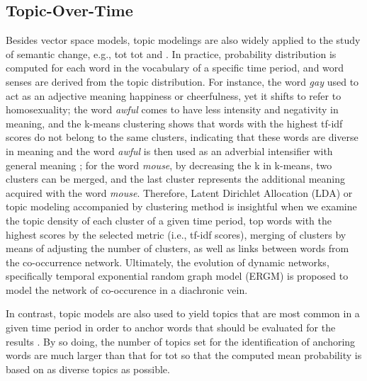 \subsection{Topic-Over-Time}
Besides vector space models, topic modelings are also widely applied to the study of semantic change, e.g., \acrlong{tot} \acrshort{tot} \parencite{wijaya2011understanding} and \textcite{hengchen2017phd}. In practice, probability distribution is computed for each word in the vocabulary of a specific time period, and word senses are derived from the topic distribution. For instance, the word \textit{gay} used to act as an adjective meaning happiness or cheerfulness, yet it shifts to refer to homosexuality; the word \textit{awful} comes to have less intensity and negativity in meaning, and the k-means clustering shows that words with the highest tf-idf scores do not belong to the same clusters, indicating that these words are diverse in meaning and the word \textit{awful} is then used as an adverbial intensifier with general meaning \parencite{wijaya2011understanding}; for the word \textit{mouse}, by decreasing the k in k-means, two clusters can be merged, and the last cluster represents the additional meaning acquired with the word \textit{mouse}. Therefore, Latent Dirichlet Allocation (LDA) or topic modeling accompanied by clustering method is insightful when we examine the topic density of each cluster of a given time period, top words with the highest scores by the selected metric (i.e., tf-idf scores), merging of clusters by means of adjusting the number of clusters, as well as links between words from the co-occurrence network. Ultimately, the evolution of dynamic networks, specifically temporal exponential random graph model (ERGM)\parencite{robins2007introduction} is proposed to model the network of co-occurence in a diachronic vein.

In contrast, topic models are also used to yield topics that are most common in a given time period in order to anchor words that should be evaluated for the results \parencite{antoniak2018evaluating}. By so doing, the number of topics set for the identification of anchoring words are much larger than that for \gls{tot} so that the computed mean probability is based on as diverse topics as possible.

